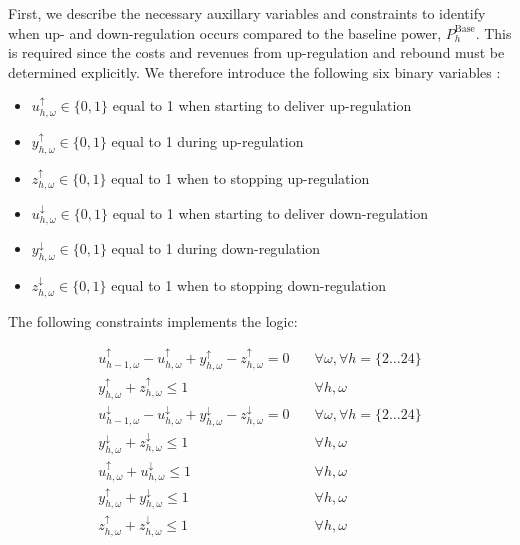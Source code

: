 {First, we describe the necessary auxillary variables and constraints to identify when up- and down-regulation occurs compared to the baseline power, $P^{\text{Base}}_{h}$. This is required since the costs and revenues from up-regulation and rebound must be determined explicitly. We therefore introduce the following six binary variables \cite{morales2013integrating}:
\\
\begin{itemize}
    \item $u^{\uparrow}_{h,\omega} \in \{0,1\}$ equal to 1 when starting to deliver up-regulation
    \item $y^{\uparrow}_{h,\omega} \in \{0,1\}$ equal to 1 during up-regulation
    \item $z^{\uparrow}_{h,\omega} \in \{0,1\}$ equal to 1 when to stopping up-regulation
    \item $u^{\downarrow}_{h,\omega} \in \{0,1\}$ equal to 1 when starting to deliver down-regulation
    \item $y^{\downarrow}_{h,\omega} \in \{0,1\}$ equal to 1 during down-regulation
    \item $z^{\downarrow}_{h,\omega} \in \{0,1\}$ equal to 1 when to stopping down-regulation
\end{itemize}

\noindent The following constraints implements the logic:

\begin{subequations}\label{eq:auxillary_constraints}
    \begin{align}
        u_{h-1,\omega}^{\uparrow} - u_{h,\omega}^{\uparrow} + y_{h,\omega}^{\uparrow} - z_{h,\omega}^{\uparrow} = 0 \quad         & \forall{\omega}, \forall{h} = \{2 \ldots 24 \} \\
        y_{h,\omega}^{\uparrow} + z_{h,\omega}^{\uparrow} \leq 1 \quad                                                            & \forall{h,\omega}                              \\
        u_{h-1,\omega}^{\downarrow} - u_{h,\omega}^{\downarrow} + y_{h,\omega}^{\downarrow} - z_{h,\omega}^{\downarrow} = 0 \quad & \forall{\omega}, \forall{h} = \{2 \ldots 24 \} \\
        y_{h,\omega}^{\downarrow} + z_{h,\omega}^{\downarrow} \leq 1 \quad                                                        & \forall{h,\omega}                              \\
        u_{h,\omega}^{\uparrow} + u_{h,\omega}^{\downarrow} \leq 1 \quad                                                          & \forall{h,\omega}                              \\
        y_{h,\omega}^{\uparrow} + y_{h,\omega}^{\downarrow} \leq 1 \quad                                                          & \forall{h,\omega}                              \\
        z_{h,\omega}^{\uparrow} + z_{h,\omega}^{\downarrow} \leq 1 \quad                                                          & \forall{h,\omega}
    \end{align}
\end{subequations}

}
